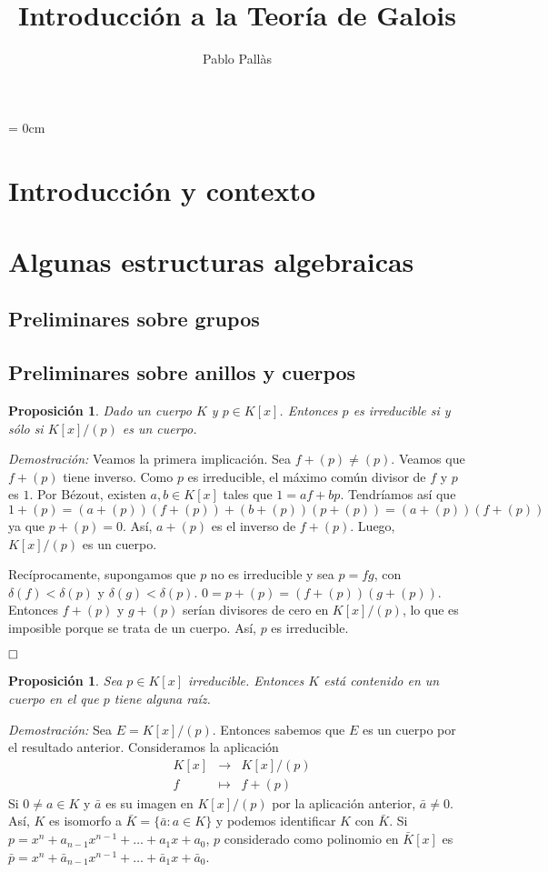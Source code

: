 \documentclass[12pt]{article}
\author{Pablo Pallàs}
\title{Introducción a la Teoría de Galois}
\newtheorem{proposition}[theorem]{Proposición}
\begin{document}
\rmfamily
\maketitle
\tableofcontents
\parindent= 0cm


\section{Introducción y contexto}
\section{Algunas estructuras algebraicas}
\subsection{Preliminares sobre grupos}
\subsection{Preliminares sobre anillos y cuerpos}
\begin{proposition} Dado un cuerpo $K$ y $p \in K[x]$. Entonces $p$ es irreducible si y sólo si $K[x]/(p)$ es un cuerpo.
\end{proposition}
\emph{Demostración: }Veamos la primera implicación. Sea $f + (p) \neq (p)$. Veamos que $f + (p)$ tiene inverso. Como $p$ es irreducible, el máximo común divisor de $f$ y $p$ es $1$. Por Bézout, existen $a,b \in K[x]$ tales que $1 = af + bp$. Tendríamos así que $$1 + (p) = (a+ (p))(f+(p)) + (b+(p))(p+(p)) = (a+ (p))(f+(p))$$ ya que $p+(p)=0$. Así, $a+(p)$ es el inverso de $f+(p)$. Luego, $K[x]/(p)$ es un cuerpo.

Recíprocamente, supongamos que $p$ no es irreducible y sea $p = fg$, con $\delta(f) < \delta (p)$ y $\delta(g) < \delta (p)$. $0 =p +(p) = (f+(p))(g+(p))$. Entonces $f + (p)$ y $g +(p)$ serían divisores de cero en $K[x]/(p)$, lo que es imposible porque se trata de un cuerpo. Así, $p$ es irreducible.

$\hfill \square$

\begin{proposition}\label{eq:ac1} Sea $p \in K[x]$ irreducible. Entonces $K$ está contenido en un cuerpo en el que $p$ tiene alguna raíz.
\end{proposition}
\emph{Demostración: } Sea $E = K[x]/(p)$. Entonces sabemos que $E$ es un cuerpo por el resultado anterior. Consideramos la aplicación  $$\begin{array}{rccl}
&K[x]&\longrightarrow &K[x]/(p) \\
&f& \longmapsto &f+(p)
\end{array}
$$
Si $0 \neq a \in K$ y $\bar{a}$ es su imagen en $K[x]/(p)$ por la aplicación anterior, $\bar{a} \neq 0$. Así, $K$ es isomorfo a $\bar{K} = \lbrace \bar{a}: a \in K \rbrace$ y podemos identificar $K$ con $\bar{K}$. Si $p = x^{n} + a_{n-1}x^{n-1} + \ldots + a_{1}x + a_{0}$, $p$ considerado como polinomio en $\bar{K}[x]$ es $\bar{p} = x^{n}+ \bar{a}_{n-1}x^{n-1}+ \ldots + \bar{a}_{1}x + \bar{a}_{0}$.
\end{document}
